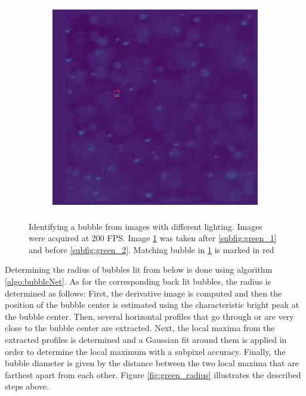 \begin{figure}
				\begin{subfigure}[t]{.55\textwidth}
					\centering
					\includegraphics[scale=0.5]{images/tracking_red_COLOR.png}
					\caption{}
					\label{subfig:red}
				\end{subfigure}
								
					\caption{Identifying a bubble from images with different lighting. Images were acquired at 200 FPS. Image \ref{subfig:red} was taken after \ref{subfig:green_1} and before \ref{subfig:green_2}. Matching bubble in \ref{subfig:red} is marked in red }
					\label{fig:radius_calib_demo}
			\end{figure}
			
			
			Determining the radius of bubbles lit from below is done using algorithm \ref{algo:bubbleNet}. As for the corresponding back lit bubbles, the radius is determined as follows:
			First, the derivative image is computed and then the position of the bubble center is estimated using the characteristic bright peak at the bubble center. Then, several horizontal profiles that go through or are very close to the bubble center are extracted. Next, the local maxima from the extracted profiles is determined and a Gaussian fit around them is applied in order to determine the local maximum with a subpixel accuracy. Finally, the bubble diameter is given by the distance between the two local maxima that are farthest apart from each other. Figure \ref{fig:green_radius} illustrates the described steps above. 
			
